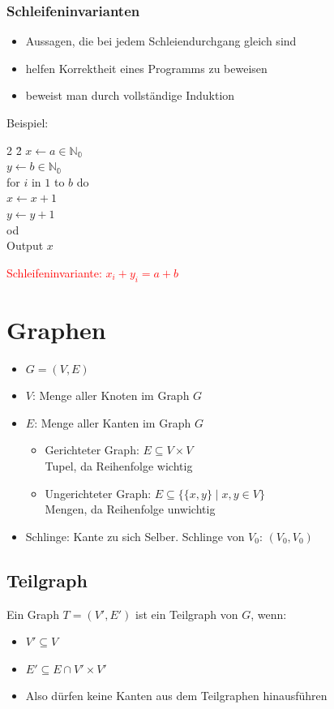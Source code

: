 \documentclass[a4paper,portrait]{scrartcl}
\begin{document}
\subsubsection{Schleifeninvarianten}
\begin{itemize}
\item Aussagen, die bei jedem Schleiendurchgang gleich sind
\item helfen Korrektheit eines Programms zu beweisen
\item beweist man durch vollständige Induktion
\end{itemize}
Beispiel:
\begin{tabbing}
    2 \= 2 \kill
    $ x \leftarrow a \in \mathbb{N_{0}} $ \\
    $ y \leftarrow b \in \mathbb{N_{0}} $ \\
    for $i$ in $1$ to $b$ do \\
    \> $ x \leftarrow x+1 $ \\
    \> $ y \leftarrow y+1 $ \\
    od \\
    Output $x$
\end{tabbing}
\textcolor{red}{Schleifeninvariante: $x_{i} + y_{i} = a+b$}
\section{Graphen}
\begin{itemize}
\item $G=(V,E)$
\item $V$: Menge aller Knoten im Graph $G$
\item $E$: Menge aller Kanten im Graph $G$
  \begin{itemize}
  \item Gerichteter Graph: $E \subseteq V \times V$ \\Tupel, da Reihenfolge wichtig
  \item Ungerichteter Graph: $E \subseteq \lbrace \lbrace x,y \rbrace \mid x,y\in V \rbrace$ \\Mengen, da Reihenfolge unwichtig
  \end{itemize}
\item Schlinge: Kante zu sich Selber. Schlinge von $V_{0}$: $(V_{0}, V_{0})$
\end{itemize}
\subsection{Teilgraph}
Ein Graph $T=(V',E')$ ist ein Teilgraph von $G$, wenn:
\begin{itemize}
\item $V' \subseteq V$
\item $E' \subseteq E \cap V' \times V'$
\item Also dürfen keine Kanten aus dem Teilgraphen hinausführen
\end{itemize}
\end{document}
